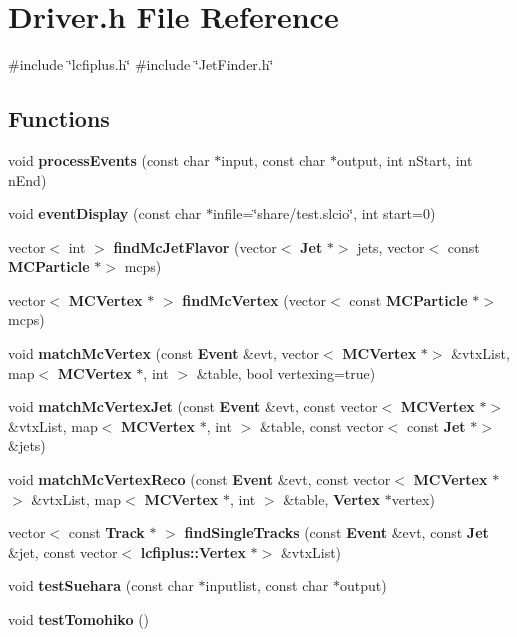 \section{Driver.\+h File Reference}
\label{Driver_8h}
{\ttfamily \#include \char`\"{}lcfiplus.\+h\char`\"{}}\newline
{\ttfamily \#include \char`\"{}Jet\+Finder.\+h\char`\"{}}\newline
\subsection*{Functions}
\begin{DoxyCompactItemize}
\item 
void \textbf{ process\+Events} (const char $\ast$input, const char $\ast$output, int n\+Start, int n\+End)
\item 
void \textbf{ event\+Display} (const char $\ast$infile=\char`\"{}share/test.\+slcio\char`\"{}, int start=0)
\item 
vector$<$ int $>$ \textbf{ find\+Mc\+Jet\+Flavor} (vector$<$ \textbf{ Jet} $\ast$$>$ jets, vector$<$ const \textbf{ M\+C\+Particle} $\ast$$>$ mcps)
\item 
vector$<$ \textbf{ M\+C\+Vertex} $\ast$ $>$ \textbf{ find\+Mc\+Vertex} (vector$<$ const \textbf{ M\+C\+Particle} $\ast$$>$ mcps)
\item 
void \textbf{ match\+Mc\+Vertex} (const \textbf{ Event} \&evt, vector$<$ \textbf{ M\+C\+Vertex} $\ast$$>$ \&vtx\+List, map$<$ \textbf{ M\+C\+Vertex} $\ast$, int $>$ \&table, bool vertexing=true)
\item 
void \textbf{ match\+Mc\+Vertex\+Jet} (const \textbf{ Event} \&evt, const vector$<$ \textbf{ M\+C\+Vertex} $\ast$$>$ \&vtx\+List, map$<$ \textbf{ M\+C\+Vertex} $\ast$, int $>$ \&table, const vector$<$ const \textbf{ Jet} $\ast$$>$ \&jets)
\item 
void \textbf{ match\+Mc\+Vertex\+Reco} (const \textbf{ Event} \&evt, const vector$<$ \textbf{ M\+C\+Vertex} $\ast$$>$ \&vtx\+List, map$<$ \textbf{ M\+C\+Vertex} $\ast$, int $>$ \&table, \textbf{ Vertex} $\ast$vertex)
\item 
vector$<$ const \textbf{ Track} $\ast$ $>$ \textbf{ find\+Single\+Tracks} (const \textbf{ Event} \&evt, const \textbf{ Jet} \&jet, const vector$<$ \textbf{ lcfiplus\+::\+Vertex} $\ast$$>$ \&vtx\+List)
\item 
void \textbf{ test\+Suehara} (const char $\ast$inputlist, const char $\ast$output)
\item 
void \textbf{ test\+Tomohiko} ()
\end{DoxyCompactItemize}


